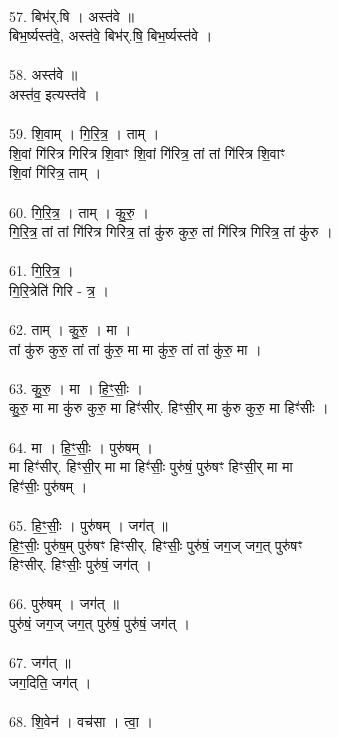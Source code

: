 \\
57. बिभ॑र्.षि । अस्त॑वे ॥\\
बिभ॒र्ष्यस्त॑वे॒, अस्त॑वे॒ बिभ॑र्.षि॒ बिभ॒र्ष्यस्त॑वे ।\\
\\
58. अस्त॑वे ॥\\
अस्त॑व॒ इत्यस्त॑वे ।\\
\\
59. शि॒वाम् । गि॒रि॒त्र॒ । ताम् ।\\
शि॒वां गि॑रित्र गिरित्र शि॒वाꣳ शि॒वां गि॑रित्र॒ तां तां गि॑रित्र शि॒वाꣳ\\
शि॒वां गि॑रित्र॒ ताम् ।\\
\\
60. गि॒रि॒त्र॒ । ताम् । कु॒रु॒ ।\\
गि॒रि॒त्र॒ तां तां गि॑रित्र गिरित्र॒ तां कु॑रु कुरु॒ तां गि॑रित्र गिरित्र॒ तां कु॑रु ।\\
\\
61. गि॒रि॒त्र॒ ।\\
गि॒रि॒त्रेति॑ गिरि - त्र॒ ।\\
\\
62. ताम् । कु॒रु॒ । मा ।\\
तां कु॑रु कुरु॒ तां तां कु॑रु॒ मा मा कु॑रु॒ तां तां कु॑रु॒ मा ।\\
\\
63. कु॒रु॒ । मा । हि॒ꣳ॒सीः॒ ।\\
कु॒रु॒ मा मा कु॑रु कुरु॒ मा हिꣳ॑सीर्. हिꣳसी॒र् मा कु॑रु कुरु॒ मा हिꣳ॑सीः ।\\
\\
64. मा । हि॒ꣳ॒सीः॒ । पुरु॑षम् ।\\
मा हिꣳ॑सीर्. हिꣳसी॒र् मा मा हिꣳ॑सीः॒ पुरु॑षं॒ पुरु॑षꣳ हिꣳसी॒र् मा मा\\
हिꣳ॑सीः॒ पुरु॑षम् ।\\
\\
65. हि॒ꣳ॒सीः॒ । पुरु॑षम् । जग॑त् ॥\\
हि॒ꣳ॒सीः॒ पुरु॑ष॒म् पुरु॑षꣳ हिꣳसीर्. हिꣳसीः॒ पुरु॑षं॒ जग॒ज् जग॒त् पुरु॑षꣳ\\
हिꣳसीर्. हिꣳसीः॒ पुरु॑षं॒ जग॑त् ।\\
\\
66. पुरु॑षम् । जग॑त् ॥\\
पुरु॑षं॒ जग॒ज् जग॒त् पुरु॑षं॒ पुरु॑षं॒ जग॑त् ।\\
\\
67. जग॑त् ॥\\
जग॒दिति॒ जग॑त् ।\\
\\
68. शि॒वेन॑ । वच॑सा । त्वा॒ । \\
